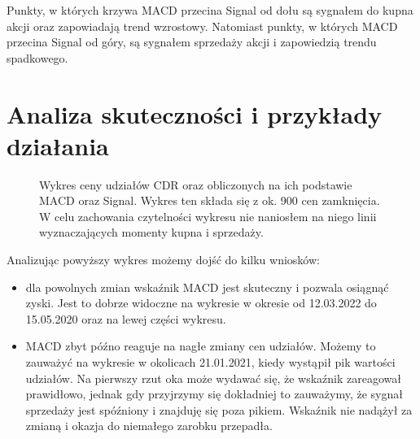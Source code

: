 \documentclass{article}
\begin{document}
    Punkty, w których krzywa MACD przecina Signal od dołu są sygnałem do kupna akcji oraz zapowiadają trend wzrostowy.
    Natomiast punkty, w których MACD przecina Signal od góry, są sygnałem sprzedaży akcji i zapowiedzią trendu spadkowego. 

\section{Analiza skuteczności i przykłady działania}
    \begin{figure}[H]
        \noindent{}
        \caption{Wykres ceny udziałów CDR oraz obliczonych na ich podstawie MACD oraz Signal. Wykres ten składa się z ok. 900 cen zamknięcia.
         W celu zachowania czytelności wykresu nie naniosłem na niego linii wyznaczających momenty kupna i sprzedaży.}
    \end{figure}

    Analizując powyższy wykres możemy dojść do kilku wniosków:
    \begin{itemize}
        \item dla powolnych zmian wskaźnik MACD jest skuteczny i pozwala osiągnąć zyski. Jest to dobrze widoczne na wykresie w okresie od 12.03.2022 do 15.05.2020 oraz na lewej części wykresu.
        \item MACD zbyt późno reaguje na nagłe zmiany cen udziałów. Możemy to zauważyć na wykresie w okolicach 21.01.2021, kiedy wystąpił pik wartości udziałów.
         Na pierwszy rzut oka może wydawać się, że wskaźnik zareagował prawidłowo, jednak gdy przyjrzymy się dokładniej to zauważymy, że sygnał sprzedaży jest spóźniony i znajduję się poza pikiem.
         Wskaźnik nie nadążył za zmianą i okazja do niemałego zarobku przepadła.
    \end{itemize}
\end{document}

